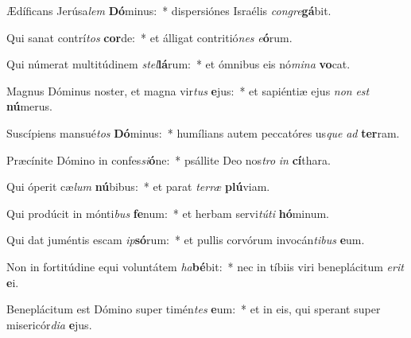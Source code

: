 \item Ædíficans Jerúsa\textit{lem} \textbf{Dó}minus:~* dispersiónes Israélis \textit{con}\textit{gre}\textbf{gá}bit.
\item Qui sanat contrí\textit{tos} \textbf{cor}de:~* et álligat contritió\textit{nes} \textit{e}\textbf{ó}rum.
\item Qui númerat multitúdinem \textit{stel}\textbf{lá}rum:~* et ómnibus eis nó\textit{mi}\textit{na} \textbf{vo}cat.
\item Magnus Dóminus noster, et magna vir\textit{tus} \textbf{e}jus:~* et sapiéntiæ ejus \textit{non} \textit{est} \textbf{nú}merus.
\item Suscípiens mansué\textit{tos} \textbf{Dó}minus:~* humílians autem peccatóres us\textit{que} \textit{ad} \textbf{ter}ram.
\item Præcínite Dómino in confes\textit{si}\textbf{ó}ne:~* psállite Deo nos\textit{tro} \textit{in} \textbf{cí}thara.
\item Qui óperit cæ\textit{lum} \textbf{nú}bibus:~* et parat \textit{ter}\textit{ræ} \textbf{plú}viam.
\item Qui prodúcit in mónti\textit{bus} \textbf{fe}num:~* et herbam servi\textit{tú}\textit{ti} \textbf{hó}minum.
\item Qui dat juméntis escam \textit{ip}\textbf{só}rum:~* et pullis corvórum invocán\textit{ti}\textit{bus} \textbf{e}um.
\item Non in fortitúdine equi voluntátem \textit{ha}\textbf{bé}bit:~* nec in tíbiis viri beneplácitum \textit{e}\textit{rit} \textbf{e}i.
\item Beneplácitum est Dómino super timén\textit{tes} \textbf{e}um:~* et in eis, qui sperant super misericór\textit{di}\textit{a} \textbf{e}jus.
